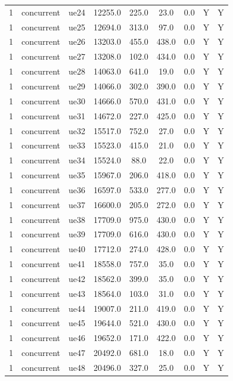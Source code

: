 \begin{table}[ht]
\begin{tabular}{|c|c|c|c|c|c|c|c|c|}
1 & concurrent & ue24 & 12255.0 & 225.0 & 23.0 & 0.0 & Y & Y \\
1 & concurrent & ue25 & 12694.0 & 313.0 & 97.0 & 0.0 & Y & Y \\
1 & concurrent & ue26 & 13203.0 & 455.0 & 438.0 & 0.0 & Y & Y \\
1 & concurrent & ue27 & 13208.0 & 102.0 & 434.0 & 0.0 & Y & Y \\
1 & concurrent & ue28 & 14063.0 & 641.0 & 19.0 & 0.0 & Y & Y \\
1 & concurrent & ue29 & 14066.0 & 302.0 & 390.0 & 0.0 & Y & Y \\
1 & concurrent & ue30 & 14666.0 & 570.0 & 431.0 & 0.0 & Y & Y \\
1 & concurrent & ue31 & 14672.0 & 227.0 & 425.0 & 0.0 & Y & Y \\
1 & concurrent & ue32 & 15517.0 & 752.0 & 27.0 & 0.0 & Y & Y \\
1 & concurrent & ue33 & 15523.0 & 415.0 & 21.0 & 0.0 & Y & Y \\
1 & concurrent & ue34 & 15524.0 & 88.0 & 22.0 & 0.0 & Y & Y \\
1 & concurrent & ue35 & 15967.0 & 206.0 & 418.0 & 0.0 & Y & Y \\
1 & concurrent & ue36 & 16597.0 & 533.0 & 277.0 & 0.0 & Y & Y \\
1 & concurrent & ue37 & 16600.0 & 205.0 & 272.0 & 0.0 & Y & Y \\
1 & concurrent & ue38 & 17709.0 & 975.0 & 430.0 & 0.0 & Y & Y \\
1 & concurrent & ue39 & 17709.0 & 616.0 & 430.0 & 0.0 & Y & Y \\
1 & concurrent & ue40 & 17712.0 & 274.0 & 428.0 & 0.0 & Y & Y \\
1 & concurrent & ue41 & 18558.0 & 757.0 & 35.0 & 0.0 & Y & Y \\
1 & concurrent & ue42 & 18562.0 & 399.0 & 35.0 & 0.0 & Y & Y \\
1 & concurrent & ue43 & 18564.0 & 103.0 & 31.0 & 0.0 & Y & Y \\
1 & concurrent & ue44 & 19007.0 & 211.0 & 419.0 & 0.0 & Y & Y \\
1 & concurrent & ue45 & 19644.0 & 521.0 & 430.0 & 0.0 & Y & Y \\
1 & concurrent & ue46 & 19652.0 & 171.0 & 422.0 & 0.0 & Y & Y \\
1 & concurrent & ue47 & 20492.0 & 681.0 & 18.0 & 0.0 & Y & Y \\
1 & concurrent & ue48 & 20496.0 & 327.0 & 25.0 & 0.0 & Y & Y \\

\end{tabular}
\end{table}
